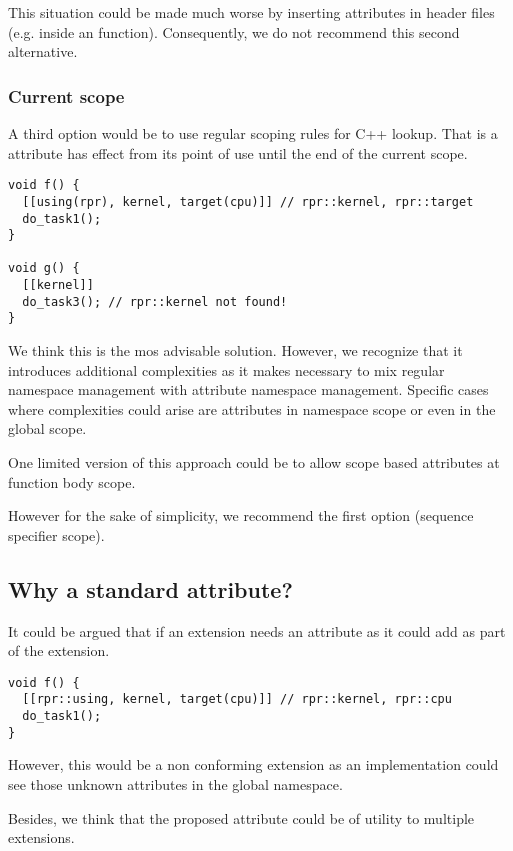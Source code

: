 This situation could be made much worse by inserting  attributes
in header files (e.g. inside an  function). Consequently, we
do not recommend this second alternative.

\subsubsection{Current scope}

A third option would be to use regular scoping rules for C++ lookup. That is
a  attribute has effect from its point of use until the end of
the current scope.

\begin{lstlisting}
void f() {
  [[using(rpr), kernel, target(cpu)]] // rpr::kernel, rpr::target
  do_task1();
}

void g() {
  [[kernel]]
  do_task3(); // rpr::kernel not found!
}
\end{lstlisting}

We think this is the mos advisable solution. However, we recognize that it introduces
additional complexities as it makes necessary to mix regular namespace management
with attribute namespace management. Specific cases where complexities could arise
are attributes in namespace scope or even in the global scope.

One limited version of this approach could be to allow scope based 
attributes at function body scope.

However for the sake of simplicity, we recommend the first option (sequence specifier scope).

\subsection{Why a standard attribute?}

It could be argued that if an extension needs an attribute as  it could add
as part of the extension.

\begin{lstlisting}
void f() {
  [[rpr::using, kernel, target(cpu)]] // rpr::kernel, rpr::cpu
  do_task1();
}
\end{lstlisting}

However, this would be a non conforming extension as an implementation could see those
unknown attributes in the global namespace.

Besides, we think that the proposed  attribute could be of utility to
multiple extensions.
